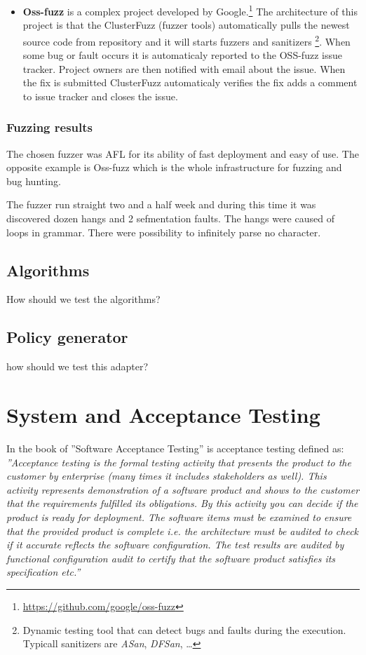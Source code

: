 \begin{itemize}
	\item \textbf{Oss-fuzz} is a complex project developed by Google.\footnote{\url{https://github.com/google/oss-fuzz}}
	The architecture of this project is that the ClusterFuzz (fuzzer tools) automatically pulls the newest source code
	from repository and it will starts fuzzers and sanitizers
	\footnote{Dynamic testing tool that can detect bugs and faults during the execution. Typicall sanitizers are \textit{ASan}, \textit{DFSan}, \ldots}.
	When some bug or fault occurs it is automaticaly reported to the OSS-fuzz issue tracker.
	Project owners are then notified with email about the issue.
	When the fix is submitted ClusterFuzz automaticaly verifies the fix adds a comment to issue tracker and closes the issue.

\end{itemize}


\subsubsection{Fuzzing results}
The chosen fuzzer was AFL for its ability of fast deployment and easy of use.
The opposite example is Oss-fuzz which is the whole infrastructure for fuzzing and bug hunting.

The fuzzer run straight two and a half week and during this time it was discovered dozen hangs and 2 sefmentation faults.
The hangs were caused of loops in grammar. There were possibility to infinitely parse no character.

\subsection{Algorithms}
How should we test the algorithms?

\subsection{Policy generator}
how should we test this adapter?

\section{System and Acceptance Testing}
In the book of ''Software Acceptance Testing'' is acceptance testing defined as:
\emph{''Acceptance testing is the formal testing activity that presents the product to the
customer by enterprise (many times it includes stakeholders as well).
This activity represents demonstration of a software product and shows to the customer
that the requirements fulfilled its obligations. By this activity you can decide if
the product is ready for deployment. The software items must be examined
to ensure that the provided product is complete i.e. the architecture must be audited to check if
it accurate reflects the software configuration. The test results are audited by functional
configuration audit to certify that the software product satisfies its specification etc.''} \cite{Schmidt2013335}

